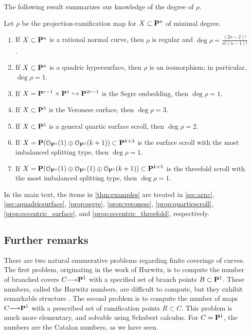 \documentclass[11pt,reqno]{amsart}
\theoremstyle{plain}
\theoremstyle{definition}
\theoremstyle{remark}
\numberwithin{equation}{section}
\renewcommand{\to}{{\longrightarrow}}
\numberwithin{equation}{section}
\renewcommand{\O}{\mathcal O}
\begin{document}
The following result summarizes our knowledge of the degree of $\rho$.
\begin{maintheorem}\label{thm:examples}
  Let $\rho$ be the projection-ramification map for $X \subset \P^n$ of minimal degree.
\begin{enumerate}
  \item If $X \subset \P^{n}$ is a rational normal curve, then $\rho$ is regular and $\deg \rho = \frac{(2n-2)!}{n!(n-1)!}$.
  \item  If $X \subset \P^{n}$ is a quadric hypersurface, then $\rho$ is an isomorphism; in particular, $\deg \rho = 1$.

  \item  If  $X = \P^{r-1} \times \P^{1} \hookrightarrow \P^{2r-1}$ is the Segre embedding, then $\deg \rho = 1$.

  \item  If $X \subset \P^{5}$ is the Veronese surface, then $ \deg \rho = 3$.
  \item If $X \subset \P^{5}$ is a general quartic surface scroll, then $\deg \rho = 2$.
  \item If $X = \P(\O_{\P^{1}}(1) \oplus \O_{\P^{1}}(k+1)) \subset \P^{k+3}$ is the surface scroll with the most imbalanced splitting type, then $\deg \rho = 1$.
  \item If $X = \P(\O_{\P^{1}}(1) \oplus \O_{\P^{1}}(1) \oplus \O_{\P^{1}}(k+1)) \subset \P^{k+5}$ is the threefold scroll with the most imbalanced splitting type, then $\deg \rho = 1$.
\end{enumerate} 
\end{maintheorem}
In the main text, the items in \autoref{thm:examples} are treated in \autoref{sec:arnc}, \autoref{sec:aquadricsurface}, \autoref{prop:segre}, \autoref{prop:veronese}, \autoref{prop:quarticscroll}, \autoref{prop:eccentric_surface}, and \autoref{prop:eccentric_threefold}, respectively.

\subsection{Further remarks}
There are two natural enumerative problems regarding finite coverings of curves.
The first problem, originating in the work of Hurwitz, is to compute the number of branched covers $C \to \P^1$ with a specified set of branch points $B \subset \P^1$.
These numbers, called the Hurwitz numbers, are difficult to compute, but they exhibit remarkable structure \cite{eke.lan.sha.ea:99,eke.lan.sha.ea:01}.
The second problem is to compute the number of maps $C \to \P^1$ with a prescribed set of ramification points $R \subset C$.
This problem is much more elementary, and solvable using Schubert calculus.
For $C = \P^1$, the numbers are the Catalan numbers, as we have seen.
\end{document}
